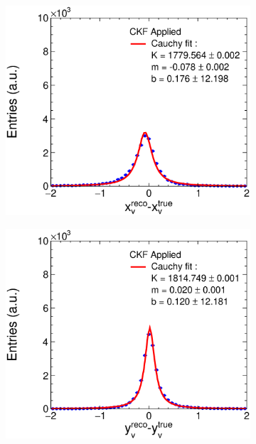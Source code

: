 \begin{figure}[t]
     \centering
     \begin{subfigure}{0.32\textwidth}
         \centering
         \includegraphics[width=\textwidth]{figures/ch5-KF_NDGAr/FullSample/Integration/ResXCKF.eps}
         \caption{}
         \label{fig:VertXCKF_Integration}
     \end{subfigure}
     \begin{subfigure}{0.32\textwidth}
         \centering
         \includegraphics[width=\textwidth]{figures/ch5-KF_NDGAr/FullSample/Integration/ResYCKF.eps}

\end{subfigure}
\end{figure}

